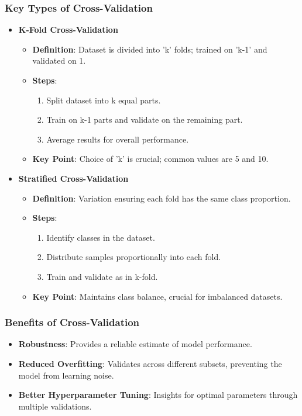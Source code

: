 \documentclass[aspectratio=169]{beamer}
\begin{document}
\begin{frame}[fragile]
    \frametitle{Key Types of Cross-Validation}
    \begin{itemize}
        \item \textbf{K-Fold Cross-Validation}
        \begin{itemize}
            \item \textbf{Definition}: Dataset is divided into 'k' folds; trained on 'k-1' and validated on 1.
            \item \textbf{Steps}:
            \begin{enumerate}
                \item Split dataset into k equal parts.
                \item Train on k-1 parts and validate on the remaining part.
                \item Average results for overall performance.
            \end{enumerate}
            \item \textbf{Key Point}: Choice of 'k' is crucial; common values are 5 and 10.
        \end{itemize}

        \item \textbf{Stratified Cross-Validation}
        \begin{itemize}
            \item \textbf{Definition}: Variation ensuring each fold has the same class proportion.
            \item \textbf{Steps}:
            \begin{enumerate}
                \item Identify classes in the dataset.
                \item Distribute samples proportionally into each fold.
                \item Train and validate as in k-fold.
            \end{enumerate}
            \item \textbf{Key Point}: Maintains class balance, crucial for imbalanced datasets.
        \end{itemize}
    \end{itemize}
\end{frame}

\begin{frame}[fragile]
    \frametitle{Benefits of Cross-Validation}
    \begin{itemize}
        \item \textbf{Robustness}: Provides a reliable estimate of model performance.
        \item \textbf{Reduced Overfitting}: Validates across different subsets, preventing the model from learning noise.
        \item \textbf{Better Hyperparameter Tuning}: Insights for optimal parameters through multiple validations.
    \end{itemize}
\end{frame}
\end{document}
